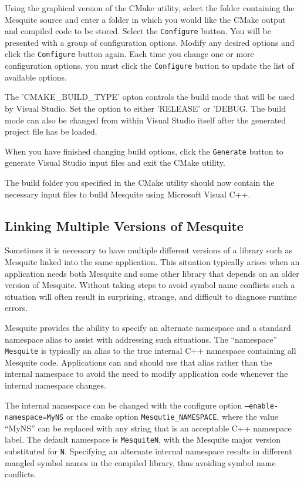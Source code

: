 Using the graphical version of the CMake utility, select the folder containing the Mesquite source and enter a folder in which you would like the CMake output and compiled code to be stored.  Select the \texttt{Configure} button.  You will be presented with a group of configuration options.  Modify any desired options and click the \texttt{Configure} button again.  Each time you change one or more configuration options, you must click the \texttt{Configure} button to update the list of available options.

 The 'CMAKE\_BUILD\_TYPE' opton controls the build mode that will be used by Visual Studio. Set the option to either 'RELEASE' or 'DEBUG.  The build mode can also be changed from within Visual Studio itself after the generated project file has be loaded.

  When you have finished changing build options, click the \texttt{Generate} button to generate Visual Studio input files and exit the CMake utility.

The build folder you specified in the CMake utility should now contain the necessary input files to build Mesquite using Microsoft Visual C++.  

\subsection{Linking Multiple Versions of Mesquite \label{namespace_mangling} }

Sometimes it is necessary to have multiple different versions of a library 
such as Mesquite linked into the same application.  This situation typically
arises when an application needs both Mesquite and some other library that depends on an older version of Mesquite.  Without taking steps to avoid symbol
name conflicts such a situation will often result in surprising, strange, and
difficult to diagnose runtime errors.  

Mesquite provides the ability to specify an alternate namespace and a standard
namespace alias to assist with addressing such situations.  The ``namespace'' \texttt{Mesquite} is typically an alias to the true internal C++ namespace containing all Mesquite code.  Applications can and should use that alias rather than the internal namespace to avoid the need to modify application code whenever the internal namespace changes.  

The internal namespace can be changed with the configure option \texttt{--enable-namespace=MyNS} or the cmake option \texttt{Mesqutie\_NAMESPACE}, where the value ``MyNS'' can be replaced with any string that is an acceptable C++ namespace label.  The default namespace is \texttt{MesquiteN}, with the Mesquite major version substituted for \texttt{N}.  Specifying an alternate internal namespace results in different mangled symbol names in the compiled library, thus avoiding symbol name conflicts.

